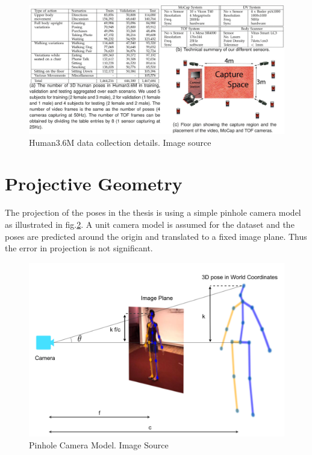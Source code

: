 \begin{figure}[h]
    \centering
    \includegraphics[width=\textwidth]{figures/h36/data_collection.pdf}
    \caption{Human3.6M data collection details. Image source \cite{H3.6}}
    \label{fig:h36_data_collection}
\end{figure}

\section{Projective Geometry}

The projection of the poses in the thesis is using a simple pinhole camera model as illustrated in fig.\ref{fig:pinhole}. A unit camera model is assumed for the dataset and the poses are predicted around the origin and translated to a fixed image plane. Thus the error in projection is not significant. 

\begin{figure}[h]
    \centering
    \includegraphics[scale=0.2]{figures/background/pinhole.png}
    \caption{Pinhole Camera Model. Image Source \cite{pinhole}}
    \label{fig:pinhole}
\end{figure}




